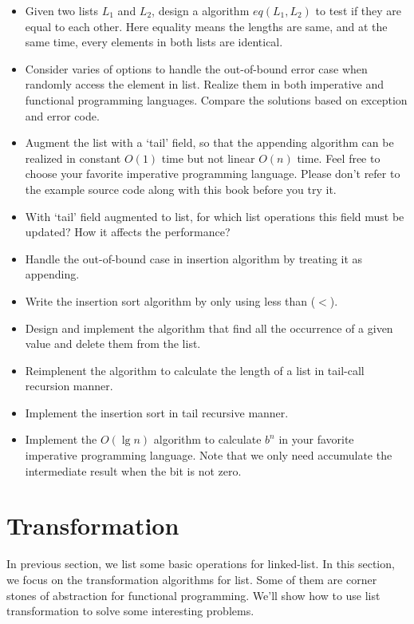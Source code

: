 \documentclass[UTF8]{article}
\begin{document}
\begin{Exercise}
\begin{itemize}
\item Given two lists $L_1$ and $L_2$, design a algorithm $eq(L_1, L_2)$ to test if they are equal to each other.
Here equality means the lengths are same, and at the same time, every elements in both lists are identical.
\item Consider varies of options to handle the out-of-bound error case when randomly access the element in list. Realize
them in both imperative and functional programming languages. Compare the solutions based on exception and error code.
\item Augment the list with a `tail' field, so that the appending algorithm can be realized in constant $O(1)$ time but
not linear $O(n)$ time. Feel free to choose your favorite imperative programming language. Please don't refer to the
example source code along with this book before you try it.
\item With `tail' field augmented to list, for which list operations this field must be updated? How it affects the
performance?
\item Handle the out-of-bound case in insertion algorithm by treating it as appending.
\item Write the insertion sort algorithm by only using less than ($<$).
\item Design and implement the algorithm that find all the occurrence of a given value and delete them from the list.
\item Reimplenent the algorithm to calculate the length of a list in tail-call recursion manner.
\item Implement the insertion sort in tail recursive manner.
\item Implement the $O(\lg n)$ algorithm to calculate $b^n$ in your favorite imperative programming language. Note that
we only need accumulate the intermediate result when the bit is not zero.
\end{itemize}
\end{Exercise}

\section{Transformation}
In previous section, we list some basic operations for linked-list. In this section, we focus on the transformation
algorithms for list. Some of them are corner stones of abstraction for functional programming. We'll show how to use
list transformation to solve some interesting problems.
\end{document}
